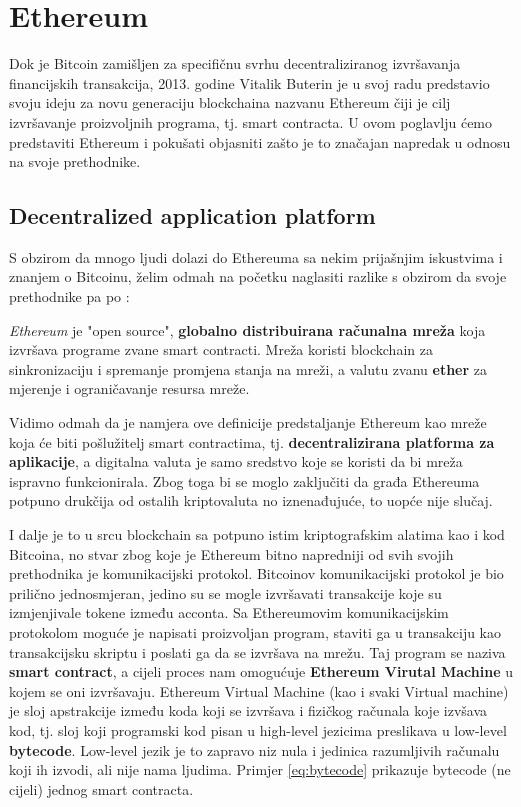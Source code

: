 \documentclass[12pt]{report}
\begin{document}
\chapter{Ethereum}

Dok je Bitcoin zamišljen za specifičnu svrhu decentraliziranog izvršavanja financijskih transakcija, 2013. godine Vitalik Buterin je u svoj radu\cite{eth_paper} predstavio svoju ideju za novu generaciju blockchaina nazvanu Ethereum čiji je cilj izvršavanje proizvoljnih programa, tj. smart contracta. U ovom poglavlju ćemo predstaviti Ethereum i pokušati objasniti zašto je to značajan napredak u odnosu na svoje prethodnike.

\section{Decentralized application platform}

S obzirom da mnogo ljudi dolazi do Ethereuma sa nekim prijašnjim iskustvima i znanjem o Bitcoinu, želim odmah na početku naglasiti razlike s obzirom da svoje prethodnike pa po \cite{ethbook}:

\begin{definicija}
\textit{Ethereum} je "open source", \textbf{globalno distribuirana računalna mreža} koja izvršava programe zvane smart contracti. Mreža koristi blockchain za sinkronizaciju i spremanje promjena stanja na mreži, a valutu zvanu \textbf{ether} za mjerenje i ograničavanje resursa mreže.
\end{definicija}

Vidimo odmah da je namjera ove definicije predstaljanje Ethereum kao mreže koja će biti pošlužitelj smart contractima, tj.  \textbf{decentralizirana platforma za aplikacije}, a digitalna valuta je samo sredstvo koje se koristi da bi mreža ispravno funkcionirala. Zbog toga bi se moglo zaključiti da građa Ethereuma potpuno drukčija od ostalih kriptovaluta no iznenađujuće, to uopće nije slučaj.

I dalje je to u srcu blockchain sa potpuno istim kriptografskim alatima kao i kod Bitcoina, no stvar zbog koje je Ethereum bitno napredniji od svih svojih prethodnika je komunikacijski protokol. Bitcoinov komunikacijski protokol je bio prilično jednosmjeran, jedino su se mogle izvršavati transakcije koje su izmjenjivale tokene između acconta. Sa Ethereumovim komunikacijskim protokolom moguće je napisati proizvoljan program, staviti ga u transakciju kao transakcijsku skriptu i poslati ga da se izvršava na mrežu. Taj program se naziva \textbf{smart contract}, a cijeli proces nam omogućuje \textbf{Ethereum Virutal Machine} u kojem se oni izvršavaju. Ethereum Virtual Machine (kao i svaki Virtual machine) je sloj apstrakcije između koda koji se izvršava i fizičkog računala koje izvšava kod, tj. sloj koji programski kod pisan u high-level jezicima preslikava u low-level \textbf{bytecode}. Low-level jezik je to zapravo niz nula i jedinica razumljivih računalu koji ih izvodi, ali nije nama ljudima. Primjer \ref{eq:bytecode} prikazuje bytecode (ne cijeli) jednog smart contracta.
\end{document}
